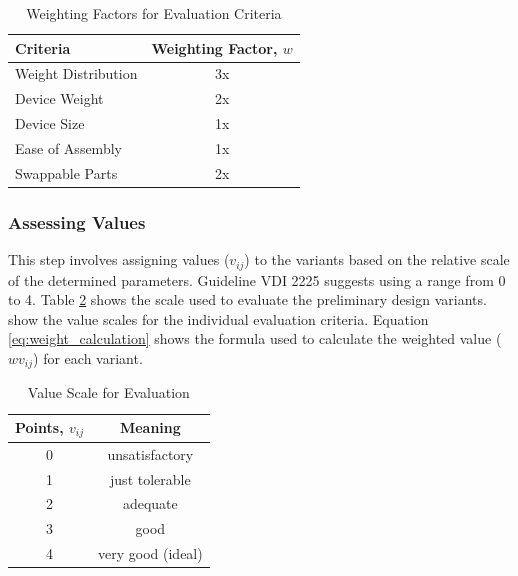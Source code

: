 \begin{table}[!ht]
    \centering
    \begin{tabular}{|l|c|}
        \hline
        \textbf{Criteria}   & \textbf{Weighting Factor, $w$} \\ \hline
        Weight Distribution & 3x                             \\ \hline
        Device Weight       & 2x                             \\ \hline
        Device Size         & 1x                             \\ \hline
        Ease of Assembly    & 1x                             \\ \hline
        Swappable Parts     & 2x                             \\ \hline
    \end{tabular}
    \caption{Weighting Factors for Evaluation Criteria}
    \label{tab:weighting}
\end{table}

\subsubsection{Assessing Values}
This step involves assigning values ($v_{ij}$) to the variants based on the relative scale of the determined parameters. Guideline VDI 2225 suggests using a range from 0 to 4. Table \ref{tab:value_scale} shows the scale used to evaluate the preliminary design variants.  show the value scales for the individual evaluation criteria. Equation \ref{eq:weight_calculation} shows the formula used to calculate the weighted value ($wv_{ij}$) for each variant.

\begin{table}[!ht]
    \centering
    \begin{tabular}{|c|c|}
        \hline
        \textbf{Points, $v_{ij}$} & \textbf{Meaning}  \\ \hline
        0                         & unsatisfactory    \\ \hline
        1                         & just tolerable    \\ \hline
        2                         & adequate          \\ \hline
        3                         & good              \\ \hline
        4                         & very good (ideal) \\ \hline
    \end{tabular}
    \caption{Value Scale for Evaluation \cite{Pahl07ad}}
    \label{tab:value_scale}
\end{table}

